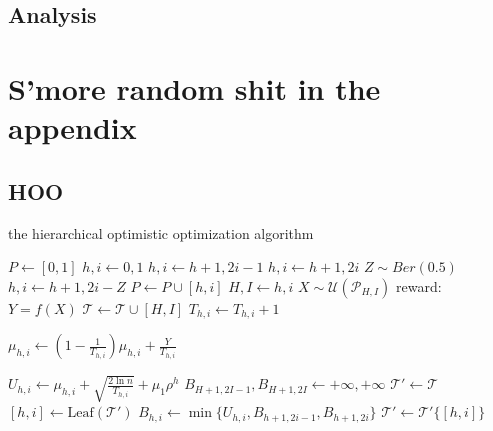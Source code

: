 \documentclass[a4paper,10pt]{article}
\begin{document}
\subsection{Analysis}

\appendix
\section{S'more random shit in the appendix}
\subsection{HOO}
\begin{algorithm}[!Htop]
	\small
\caption{the hierarchical optimistic optimization algorithm}
\begin{algorithmic}[1]
		\State $P \gets {[0,1]}$
		\State $h,i\gets 0,1$
				\State $h,i \gets h+1,2i-1 $
				\State $h,i \gets h+1,2i $
			\Else
				\State $Z \sim Ber(0.5)$
				\State $h,i \gets h+1,2i-Z$
			\EndIf
			\State $P \gets P \cup {[h,i]}$
		\EndWhile
		\State $H,I \gets h,i$
		\State $X \sim \mathcal{U}(\mathcal{P}_{H,I})$
		\State reward: $Y = f(X)$
		\State $\mathcal{T} \gets \mathcal{T} \cup {[H,I]}$
			\State $T_{h,i} \gets T_{h,i}+1$
			\begin{large}
			\State $\mu_{h,i}\gets (1-\frac{1}{T_{h,i}})\mu_{h,i}+\frac{Y}{T_{h,i}}$
			\end{large}
		\EndFor
			\State $U_{h,i}\gets \mu_{h,i}+\sqrt{\frac{2\ln n}{T_{h,i}}}+\mu_1 \rho^h$
		\EndFor
		\State $B_{H+1,2I-1},B_{H+1,2I} \gets +\infty,+\infty$
		\State $\mathcal{T}' \gets \mathcal{T}$
			\State $[h,i] \gets \text{Leaf}(\mathcal{T}')$
			\State $B_{h,i} \gets \min\{U_{h,i},B_{h+1,2i-1},B_{h+1,2i}\}$
			\State $\mathcal{T}' \gets \mathcal{T}'\{[h,i]\}$
		\EndWhile
	\EndFor
\end{algorithmic}
\end{algorithm}
\end{document}
